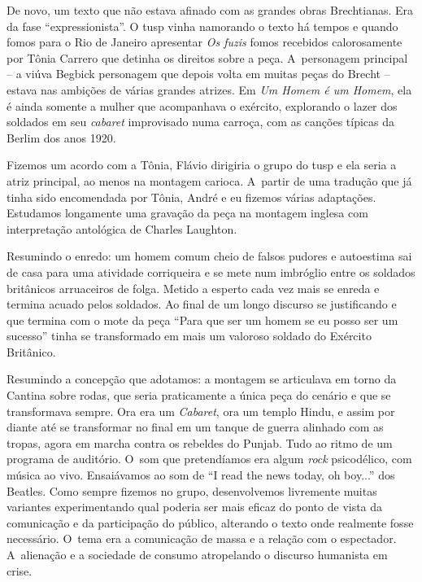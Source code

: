 De novo, um texto que não estava afinado com as grandes obras
Brechtianas. Era da fase “expressionista”. O {\sc tusp} vinha namorando o
texto há tempos e quando fomos para o Rio de Janeiro apresentar {\it Os
fuzis} fomos recebidos calorosamente por Tônia Carrero que detinha os
direitos sobre a peça. A~personagem principal -- a viúva Begbick
personagem que depois volta em muitas peças do Brecht -- estava nas
ambições de várias grandes atrizes. Em {\it Um Homem é um Homem}, ela é
ainda somente a mulher que acompanhava o exército, explorando o lazer
dos soldados em seu {\it cabaret} improvisado numa carroça, com as
canções típicas da Berlim dos anos 1920.

Fizemos um acordo com a Tônia, Flávio dirigiria o grupo do {\sc tusp} e ela
seria a atriz principal, ao menos na montagem carioca. A~partir de uma
tradução que já tinha sido encomendada por Tônia, André e eu fizemos
várias adaptações. Estudamos longamente uma gravação da peça na montagem
inglesa com interpretação antológica de Charles Laughton.

Resumindo o enredo: um homem comum cheio de falsos pudores e autoestima
sai de casa para uma atividade corriqueira e se mete num imbróglio entre
os soldados britânicos arruaceiros de folga. Metido a esperto cada vez
mais se enreda e termina acuado pelos soldados. Ao final de um longo
discurso se justificando e que termina com o mote da peça “Para que ser
um homem se eu posso ser um sucesso” tinha se transformado em mais um
valoroso soldado do Exército Britânico.

Resumindo a concepção que adotamos: a montagem se articulava em torno da
Cantina sobre rodas, que seria praticamente a única peça do cenário e
que se transformava sempre. Ora era um {\it Cabaret}, ora um templo
Hindu, e assim por diante até se transformar no final em um tanque de
guerra alinhado com as tropas, agora em marcha contra os rebeldes do
Punjab. Tudo ao ritmo de um programa de auditório. O~som que
pretendíamos era algum {\it rock} psicodélico, com música ao vivo.
Ensaiávamos ao som de “I read the news today, oh boy...” dos Beatles.
Como sempre fizemos no grupo, desenvolvemos livremente muitas variantes
experimentando qual poderia ser mais eficaz do ponto de vista da
comunicação e da participação do público, alterando o texto onde
realmente fosse necessário. O~tema era a comunicação de massa e a
relação com o espectador. A~alienação e a sociedade de consumo
atropelando o discurso humanista em crise.

\subject{Repressão política e fim do {\cap tusp}}

